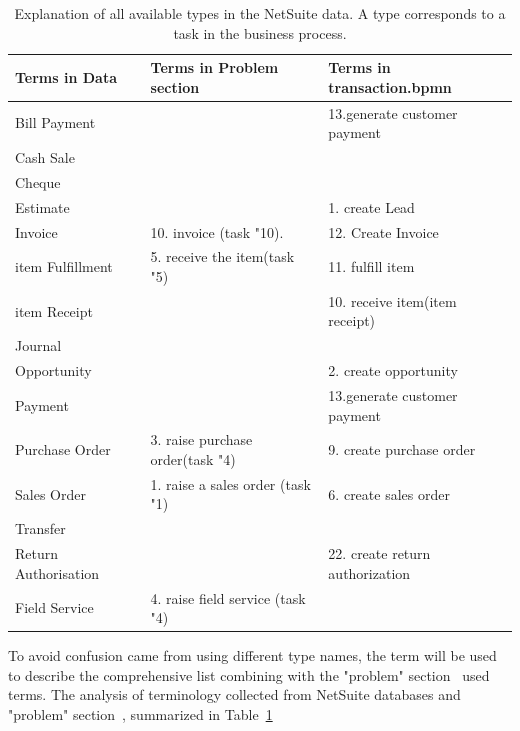 



\begin{table}[htb]
\footnotesize	 %
\begin{tabularx}{\textwidth}{X|X|X}
\hline
\textbf{Terms in Data} & \textbf{Terms in Problem section} & \textbf{Terms in transaction.bpmn} \\

\hline
Bill Payment &  & 13.generate customer payment\\
\hline
Cash Sale  &  & \\
\hline
Cheque  &  & \\
\hline
Estimate  &  &1. create Lead \\
\hline
Invoice  & 10. invoice (task "10). & 12. Create Invoice \\
\hline
item Fulfillment  & 5. receive the item(task "5) & 11. fulfill item \\
\hline
item Receipt  &  & 10. receive item(item receipt)\\
\hline
Journal  &  \\
\hline
Opportunity  &  & 2. create opportunity\\
\hline
Payment  &  & 13.generate customer payment\\
\hline
Purchase Order  & 3. raise purchase order(task "4) & 9. create purchase order  \\
\hline
Sales Order  & 1. raise a sales order (task "1) & 6. create sales order\\
\hline
Transfer  &  \\
\hline
Return Authorisation  & & 22. create return authorization \\
\hline
Field Service  & 4. raise field service (task "4)   \\
\hline
\end{tabularx}
\caption{Explanation of all available types in the NetSuite data. A type corresponds to a task in the business process.}
\label{table:terminologyData}
\end{table}

To avoid confusion came from using different type names, the term will be used to describe the comprehensive list combining with the "problem" section~\pageref{figure:soAndfieldservice} used terms. The analysis of terminology collected from NetSuite databases and "problem" section~\pageref{figure:soAndfieldservice}, summarized in Table~\ref{table:terminologyData}

